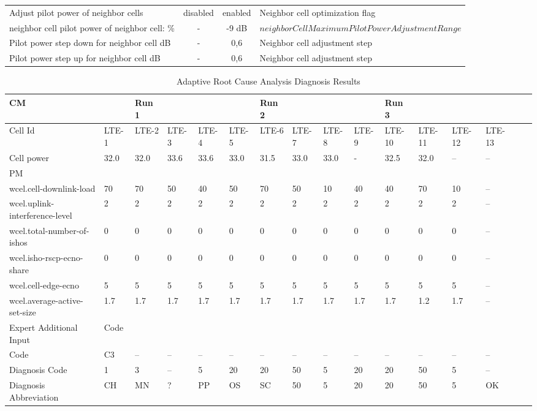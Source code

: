 \documentclass[conference]{IEEEtran}
\begin{document}
\begin{table}[!t]
\begin{tabular}{@{}lccl@{}}
	
							
Adjust pilot power of neighbor cells&disabled &enabled&Neighbor cell optimization flag\\							 neighbor cell pilot power of neighbor cell: \% &-&-9 dB& $neighborCellMaximumPilotPowerAdjustmentRange$ \\			Pilot power step down for neighbor cell dB	&-&0,6&Neighbor cell adjustment step\\										
Pilot power step up for neighbor cell dB&-&0,6&Neighbor cell adjustment step\\
\hline
\end{tabular}
\end{table}





\begin{table}[!t]
\renewcommand{\arraystretch}{1.3}
\caption{Adaptive Root Cause Analysis Diagnosis Results}
\label{case_3_4_results}
\centering
\begin{tabular}{@{}l|lllllllllllllll@{}}\hline
CM  &&Run 1&&&&Run 2&&&&Run 3& \\\hline						
Cell Id&LTE-1&LTE-2&LTE-3&LTE-4&LTE-5&LTE-6&LTE-7&LTE-8&LTE-9&LTE-10&LTE-11&LTE-12&LTE-13\\
Cell power&32.0&32.0&33.6&33.6&33.0&31.5&33.0&33.0&-&32.5&32.0&--&--\\
PM&&&&&&&&&&&\\\hline										wcel.cell-downlink-load&70&70&50&40&50&70&50&10&40&40&70&10&--\\
wcel.uplink-interference-level&2&2&2&2&2&2&2&2&2&2&2&2&--\\
wcel.total-number-of-ishos&0&0&0&0&0&0&0&0&0&0&0&0&--\\
wcel.isho-rscp-ecno-share&0&0&0&0&0&0&0&0&0&0&0&0&--\\
wcel.cell-edge-ecno&5&5&5&5&5&5&5&5&5&5&5&5&--\\
wcel.average-active-set-size&1.7&1.7&1.7&1.7&1.7&1.7&1.7&1.7&1.7&1.7&1.2&1.7&--\\
Expert Additional Input&Code&&&&&&&&&& \\\hline									

Code&C3&--&--&--&--&--&--&--&--&--&--&--&--\\
\hline\hline
Diagnosis Code 
&1&3&--&5&20&20&50&5&20&20&50&5&--\\
Diagnosis Abbreviation
&CH&MN&?&PP&OS&SC&50&5&20&20&50&5&OK\
\\\hline\hline
\end{tabular}
\end{table}
\end{document}
